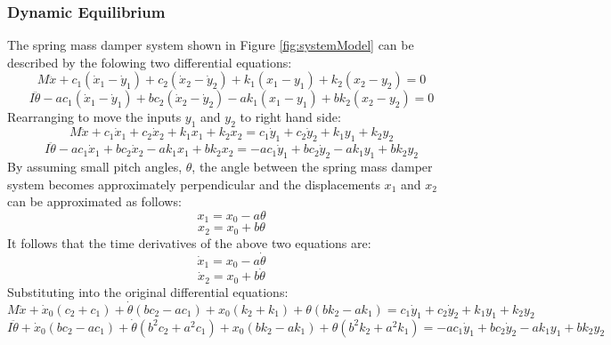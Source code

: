 \documentclass[12pt]{article}
\begin{document}
\subsubsection{Dynamic Equilibrium}
The spring mass damper system shown in Figure \ref{fig:systemModel} can be described by the folowing two differential equations: 
\begin{equation}
	M \ddot x + c_1(\dot x_1 - \dot y_1) + c_2(\dot x_2 - \dot y_2) + k_1(x_1 - y_1) + k_2(x_2 - y_2) = 0
\end{equation}
\begin{equation}
	I \ddot\theta - ac_1(\dot x_1 - \dot y_1) + bc_2(\dot x_2 - \dot y_2) - ak_1(x_1 - y_1) + bk_2(x_2 - y_2) = 0
\end{equation}
Rearranging to move the inputs $y_1$ and $y_2$ to right hand side: 
\begin{equation}
	M \ddot x + c_1\dot x_1 + c_2\dot x_2 + k_1x_1 + k_2x_2 = c_1\dot y_1 + c_2\dot y_2 + k_1y_1 + k_2y_2
\end{equation}
\begin{equation}
	I \ddot\theta - ac_1\dot x_1 + bc_2\dot x_2 - ak_1x_1 + bk_2x_2 = -ac_1\dot y_1 + bc_2\dot y_2 - ak_1y_1 + bk_2y_2
\end{equation}
By assuming small pitch angles, $\theta$, the angle between the spring mass damper system becomes approximately perpendicular and the displacements $x_1$ and $x_2$ can be approximated as follows:
\begin{equation}
	x_1 = x_0 - a\theta
\end{equation}
\begin{equation}
	x_2 = x_0 + b\theta
\end{equation}
It follows that the time derivatives of the above two equations are: 
\begin{equation}
	\dot x_1 = x_0 - a\dot\theta
\end{equation}
\begin{equation}
	\dot x_2 = x_0 + b\dot\theta
\end{equation}
Substituting into the original differential equations: 
\begin{equation}
	M \ddot x + \dot x_0(c_2+c_1) + \dot\theta(bc_2-ac_1) + x_0(k_2+k_1) + \theta(bk_2-ak_1)= c_1\dot y_1 + c_2\dot y_2 + k_1y_1 + k_2y_2
\end{equation}
\begin{equation}
	I \ddot\theta + \dot x_0(bc_2-ac_1) + \dot\theta(b^2c_2+a^2c_1) + x_0(bk_2-ak_1) + \theta(b^2k_2+a^2k_1) = -ac_1\dot y_1 + bc_2\dot y_2 - ak_1y_1 + bk_2y_2
\end{equation}
\end{document}
